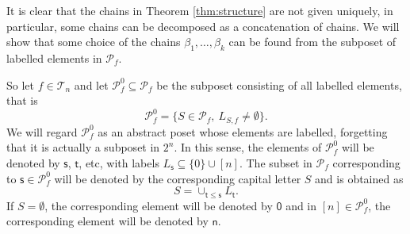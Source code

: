 \documentclass[12pt]{article}
\theoremstyle{definition}
\theoremstyle{remark}
\def\Te{\mathcal T}
\def\Pe{\mathcal P}
\begin{document}
%
%
%
%
%
%



It is clear that the chains in Theorem \ref{thm:structure} are not given uniquely, in
particular, some chains can be decomposed as a  concatenation of chains.
We will show that some choice of the chains $\beta_1,\dots,\beta_k$  can be found from the subposet
 of labelled elements in $\Pe_f$.





So let  $f\in \Te_n$ and let $\Pe_f^0\subseteq \Pe_f$ be the subposet consisting
of  all  labelled elements, that is
\[
\Pe_f^0=\{S\in \Pe_f, \ L_{S,f}\ne \emptyset \}.
\]
We will regard $\Pe_f^0$ as an abstract poset whose elements are labelled, forgetting that it is actually a subposet in $2^n$.  
In this sense, the elements of $\Pe_f^0$ will be denoted by $\mathsf{s}$, $\mathsf{t}$,
etc, with labels $L_{\mathsf{s}}\subseteq \{0\}\cup [n]$. The subset in $\Pe_f$ corresponding to
$\mathsf{s}\in \Pe_f^0$ will be denoted by the corresponding capital letter $S$ and is obtained as 
\[
S=\cup_{\mathsf{t}\le \mathsf{s}} L_{\mathsf{t}}.
\]
If $S=\emptyset$, the corresponding element will be denoted by $\mathsf{0}$ and in $[n]\in
\Pe_f^0$, the corresponding element will be denoted by $\mathsf{n}$.
\end{document}
